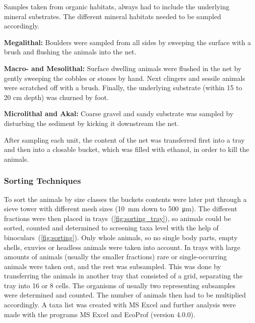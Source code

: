 Samples taken from organic habitats, always had to include the underlying mineral substrates. The different mineral habitats needed to be sampled accordingly.
\begin{list}{}
  \item {\textbf{Megalithal:} Boulders were sampled from all sides by sweeping the surface with a brush and flushing the animals into the net.}
  \item {\textbf{Macro- and Mesolithal:} Surface dwelling animals were flushed in the net by gently sweeping the cobbles or stones by hand. Next clingers and sessile animals were scratched off with a brush. Finally, the underlying substrate (within 15 to 20 cm depth) was churned by foot.}
  \item {\textbf{Microlithal and Akal:} Coarse gravel and sandy substrate was sampled by disturbing the sediment by kicking it downstream the net.}
\end{list}

After sampling each unit, the content of the net was transferred first into a tray and then into a closable bucket, which was filled with ethanol, in order to kill the animals.


\subsubsection{Sorting Techniques}\label{sec:sorting_technigues}      %

To sort the animals by size classes the buckets contents were later put through a sieve tower with different mesh sizes (\SI{10}{\milli\meter} down to \SI{500}{\micro\meter}). The different fractions were then placed in trays~(\cref{fig:sorting_tray}), so animals could be sorted, counted and determined to screening taxa level with the help of binoculars~(\cref{fig:sorting}). Only whole animals, so no single body parts, empty shells, exuvies or headless animals were taken into account. In trays with large amounts of animals (usually the smaller fractions) rare or single-occurring animals were taken out, and the rest was subsampled. This was done by transferring the animals in another tray that consisted of a grid, separating the tray into 16 or 8 cells. The organisms of usually two representing subsamples were determined and counted. The number of animals then had to be multiplied accordingly.
A taxa list was created with MS Excel and further analysis were made with the programs MS Excel and EcoProf (version 4.0.0).






